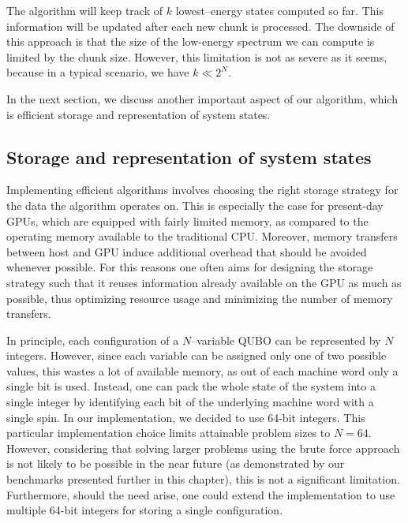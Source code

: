     The algorithm will keep track of $k$ lowest--energy states computed so far.
    This information will be updated after each new chunk is processed. The
    downside of this approach is that the size of the low-energy spectrum we can
    compute is limited by the chunk size. However, this limitation is not as severe
    as it seems, because in a typical scenario, we have $k \ll 2^{N}$.

In the next section, we discuss another important aspect of our algorithm,
which is efficient storage and representation of system states.

\subsection{Storage and representation of system states}
Implementing efficient algorithms involves choosing the right storage strategy
for the data the algorithm operates on. This is especially the case for
present-day GPUs, which are equipped with fairly limited memory, as compared to
the operating memory available to the traditional CPU. Moreover, memory
transfers between host and GPU induce additional overhead that should be
avoided whenever possible. For this reasons one often aims for designing the
storage strategy such that it reuses information already available on the GPU
as much as possible, thus optimizing resource usage and minimizing the number
of memory transfers.

In principle, each configuration of a $N$--variable QUBO can be represented by
$N$ integers. However, since each variable can be assigned only one of two
possible values, this wastes a lot of available memory, as out of each machine
word only a single bit is used. Instead, one can pack the whole state of the
system into a single integer by identifying each bit of the underlying machine
word with a single spin. In our implementation, we decided to use 64-bit
integers. This particular implementation choice limits attainable problem sizes
to $N=64$. However, considering that solving larger problems using the brute
force approach is not likely to be possible in the near future (as demonstrated
by our benchmarks presented further in this chapter), this is not a significant
limitation. Furthermore, should the need arise, one could extend the
implementation to use multiple 64-bit integers for storing a single
configuration.

